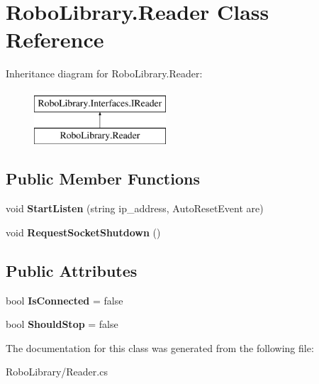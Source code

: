 \hypertarget{class_robo_library_1_1_reader}{}\section{Robo\+Library.\+Reader Class Reference}
\label{class_robo_library_1_1_reader}
Inheritance diagram for Robo\+Library.\+Reader\+:\begin{figure}[H]
\begin{center}
\leavevmode
\includegraphics[height=2.000000cm]{class_robo_library_1_1_reader}
\end{center}
\end{figure}
\subsection*{Public Member Functions}
\begin{DoxyCompactItemize}
\item 
\hypertarget{class_robo_library_1_1_reader_a9c0b25d0958e6d6a59c3bf9f772d37d0}{}\label{class_robo_library_1_1_reader_a9c0b25d0958e6d6a59c3bf9f772d37d0} 
void {\bfseries Start\+Listen} (string ip\+\_\+address, Auto\+Reset\+Event are)
\item 
\hypertarget{class_robo_library_1_1_reader_adf6670473fb8dbc1cafbd82dbfae3c56}{}\label{class_robo_library_1_1_reader_adf6670473fb8dbc1cafbd82dbfae3c56} 
void {\bfseries Request\+Socket\+Shutdown} ()
\end{DoxyCompactItemize}
\subsection*{Public Attributes}
\begin{DoxyCompactItemize}
\item 
\hypertarget{class_robo_library_1_1_reader_a930d627919a5268586350aa9b61e5f2b}{}\label{class_robo_library_1_1_reader_a930d627919a5268586350aa9b61e5f2b} 
bool {\bfseries Is\+Connected} = false
\item 
\hypertarget{class_robo_library_1_1_reader_a2c4d988beace95d044f038085993bc82}{}\label{class_robo_library_1_1_reader_a2c4d988beace95d044f038085993bc82} 
bool {\bfseries Should\+Stop} = false
\end{DoxyCompactItemize}


The documentation for this class was generated from the following file\+:\begin{DoxyCompactItemize}
\item 
Robo\+Library/Reader.\+cs\end{DoxyCompactItemize}

